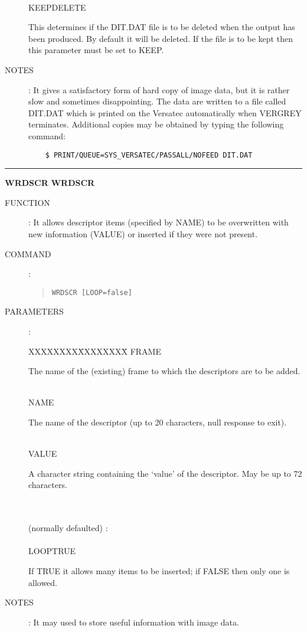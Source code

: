 \begin{description}
\begin{tabbing}
\begin{minipage}[t]{100mm}
\end{minipage}\\
KEEP\>DELETE\>\begin{minipage}[t]{100mm}
This determines if the DIT.DAT file is to be deleted when the output has been
produced.
By default it will be deleted.
If the file is to be kept then this parameter must be set to KEEP.
\end{minipage}
\end{tabbing}
\item [NOTES]:
It gives a satisfactory form of hard copy of image data, but it is rather slow
and sometimes disappointing.
The data are written to a file called DIT.DAT which is printed on the Versatec
automatically when VERGREY terminates.
Additional copies may be obtained by typing the following command:
\begin{verbatim}
    $ PRINT/QUEUE=SYS_VERSATEC/PASSALL/NOFEED DIT.DAT
\end{verbatim}
\end{description}

\goodbreak
\rule{\textwidth}{0.3mm}
{\Large {\bf WRDSCR} \hfill {\bf WRDSCR}}
\begin{description}
\item [FUNCTION]:
It allows descriptor items (specified by NAME) to be overwritten with new
information (VALUE) or inserted if they were not present.
\item [COMMAND]:
\begin{quote}
{\tt WRDSCR   [LOOP=false]}
\end{quote}
\item [PARAMETERS] :
\begin{tabbing}
XXXXXXXX\=XXXXXXXX\=\kill
FRAME\>\>\begin{minipage}[t]{100mm}
The name of the (existing) frame to which the descriptors are to be added.
\end{minipage}\\
NAME\>\>\begin{minipage}[t]{100mm}
The name of the descriptor (up to 20 characters, null response to exit).
\end{minipage}\\
VALUE\>\>\begin{minipage}[t]{100mm}
A character string containing the `value' of the descriptor.
May be up to 72 characters.
\end{minipage}\\
\\
(normally defaulted) :\\
\\
LOOP\>TRUE\>\begin{minipage}[t]{100mm}
If TRUE it allows many items to be inserted; if FALSE then only one is allowed.
\end{minipage}
\end{tabbing}
\item [NOTES]:
It may used to store useful information with image data.
\end{description}


